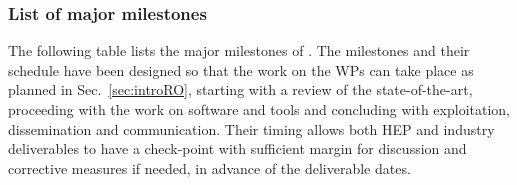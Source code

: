%
%
%
%
\FloatBarrier
\vspace{-6mm}
\subsubsection{List of major milestones}
\label{sub:milestones}
The following table lists the major milestones of \acronym. 
The milestones and their schedule have been designed so that the work on the WPs can take place as planned in Sec.~\ref{sec:introRO}, starting with a review of the state-of-the-art, proceeding with the work on software and tools and concluding with exploitation, dissemination and communication. Their timing allows both HEP and industry deliverables to have a check-point with sufficient margin for discussion and corrective measures if needed, in advance of the deliverable dates.  



\FloatBarrier
\vspace{-8mm}
